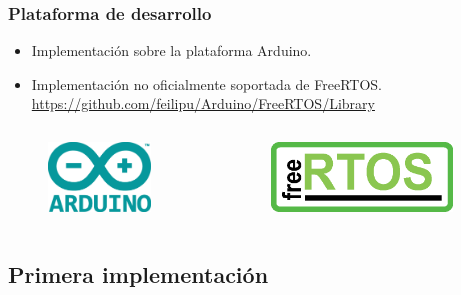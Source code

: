 \begin{frame}
\frametitle{Plataforma de desarrollo}
\begin{block}{}
	\begin{itemize}
		\item Implementación sobre la plataforma Arduino.
		\item Implementación no oficialmente soportada de FreeRTOS. \href{https://github.com/feilipu/Arduino/FreeRTOS/Library}{https://github.com/feilipu/Arduino/FreeRTOS/Library}
	\end{itemize}

\begin{columns}[T]
	\begin{column}{.35\linewidth}
	\begin{figure}[htbp]
		\centering
		\includegraphics[height=5em, right]{diagramas/arduino.eps}
	\end{figure}
	\end{column}
	\hfill
	\begin{column}{.50\linewidth}
		
		\begin{figure}[htbp]
			\includegraphics[height=5em,left]{diagramas/freertos.eps}
		\end{figure}
		
	\end{column}
\end{columns}
\end{block}
\end{frame}

\subsection{Primera implementación}

